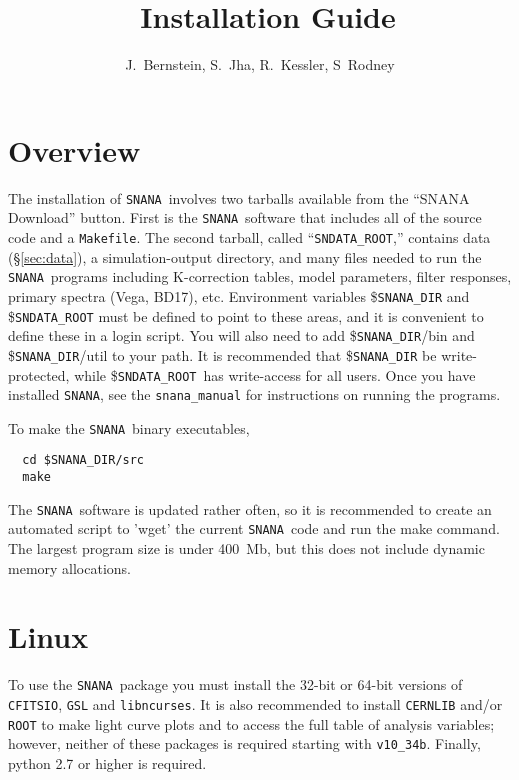 \documentclass[12pt]{article}
\title{ \snana\ Installation Guide }
\author{J.~Bernstein, S.~Jha, R.~Kessler, S~Rodney }
\newcommand{\snana}{{\tt SNANA}}
\newcommand{\snanadir}{{\tt SNANA\_DIR}}
\newcommand{\sndataroot}{{\tt SNDATA\_ROOT}}
\begin{document}
\maketitle
\tableofcontents


   \section{Overview}


The installation of \snana\ involves two tarballs
available from the ``SNANA Download'' button.
First is the \snana\ software that includes all of
the source code and a {\tt Makefile}.
The second tarball, called ``\sndataroot,''
contains data (\S\ref{sec:data}), 
a simulation-output directory, 
and many files needed to run the \snana\ programs including
K-correction tables, model parameters,
filter responses, primary spectra (Vega, BD17), etc.
Environment variables 
\${\snanadir} and  \${\sndataroot}
must be defined to point to these areas,
and it is convenient to define these in a login script.
You will also need to add 
\$\snanadir/bin and \$\snanadir/util to your path.
It is recommended that \${\snanadir} be write-protected,
while \$\sndataroot\ has write-access for all users.
Once you have installed \snana, see the {\tt snana\_manual}
for instructions on running the programs.


To make the \snana\ binary executables,
\begin{verbatim}  
  cd $SNANA_DIR/src
  make
\end{verbatim}
The \snana\ software is updated rather often, so it is recommended
to create an automated script to 'wget' the current \snana\ code
and run the make command.
The largest program size is under 400~Mb, but this does 
not include dynamic memory allocations.


   \clearpage
   \section{Linux}


To use the \snana\ package you must install the 32-bit or 64-bit
versions of 
{\tt CFITSIO}, {\tt GSL} and {\tt libncurses}.
It is also recommended to install {\tt CERNLIB} and/or {\tt ROOT}
to make light curve plots and to access the full table of
analysis variables; however, neither of these packages is
required starting with {\tt v10\_34b}.
Finally, python 2.7 or higher is required.
\end{document}
